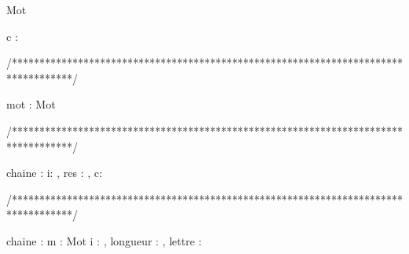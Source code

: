 \begin{algorithme}
    
    \begin{enregistrement}{Mot}%
    \end{enregistrement}

      {c : \caractere}%
      {\booleen}%
      {}%
      {
      }
\end{algorithme}

/***********************************************************************************/
\begin{algorithme}
       {mot : Mot}%
       {\entier}%
       {}%
       {
         

        }
\end{algorithme}

/***********************************************************************************/
\begin{algorithme}
     {chaine : \chaine}%
     {\booleen}%
     {i: \entier, res : \booleen, c: \caractere}%
     {     

        	{
        	}%
        	{

			   {
				  {
				  }%
		           }%
                }%
        
      }
  
\end{algorithme}

/***********************************************************************************/
\begin{algorithme}
     {chaine : \chaine}%
     {m : Mot}%
     {i : \entier, longueur : \entier, lettre : \caractere }%
     {
	  {
	  }
     }
\end{algorithme}

